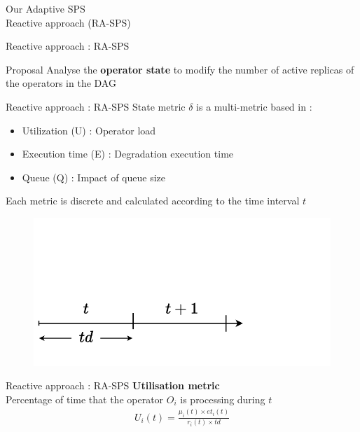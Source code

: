 \begin{frame}[noframenumbering]
	\centering
	\huge Our Adaptive SPS \\ Reactive approach (RA-SPS)
\end{frame}


\begin{frame}{Reactive approach : RA-SPS}
	\begin{block}{Proposal}
	Analyse the \textbf{operator state} to modify the number of active replicas of the operators in the DAG		
	\end{block}
\end{frame}

\begin{frame}{Reactive approach : RA-SPS}
	State metric $\delta$ is a multi-metric based in : 
	\begin{itemize}
		\item Utilization (U) : Operator load
		\item Execution time (E) : Degradation execution time
		\item Queue (Q) : Impact of queue size
	\end{itemize}
	\vspace*{0.5cm}	
	Each metric is discrete and calculated according to the time interval $t$
	\vspace*{-2.5cm}
	\begin{figure}
		\includegraphics[scale=0.75]{images/concepts/Interval.pdf}
	\end{figure}
\end{frame}

\begin{frame}{Reactive approach : RA-SPS}
	\textbf{Utilisation metric}\\
	\vspace*{0.2cm}
	Percentage of time that the operator $O_i$ is processing during $t$
	\begin{align*}
        U_i(t) = \frac{\mu_i(t) \times et_i(t)}{r_i(t) \times td}
   	\end{align*}   	
\end{frame}

